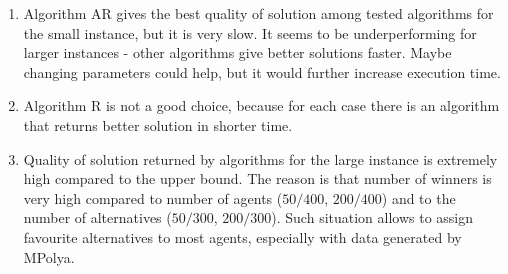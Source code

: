 \begin{enumerate}
	\item Algorithm AR gives the best quality of solution among tested algorithms for the small instance, but it is very slow. It seems to be underperforming for larger instances - other algorithms give better solutions faster. Maybe changing parameters could help, but it would further increase execution time.
    \item Algorithm R is not a good choice, because for each case there is an algorithm that returns better solution in shorter time.
	\item Quality of solution returned by algorithms for the large instance is extremely high compared to the upper bound. The reason is that number of winners is very high compared to number of agents ($50/400$, $200/400$) and to the number of alternatives ($50/300$, $200/300$). Such situation allows to assign favourite alternatives to most agents, especially with data generated by MPolya.
\end{enumerate}